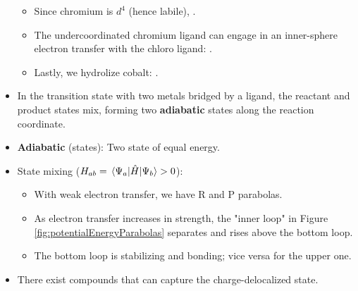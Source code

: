 \documentclass[../notes.tex]{subfiles}
\begin{document}
\begin{itemize}
    \begin{itemize}
        \item Since chromium is $d^4$ (hence labile), .
        \item The undercoordinated chromium ligand can engage in an inner-sphere electron transfer with the chloro ligand: .
        \item Lastly, we hydrolize cobalt: .
    \end{itemize}
    \item In the transition state with two metals bridged by a ligand, the reactant and product states mix, forming two \textbf{adiabatic} states along the reaction coordinate.
    \item \textbf{Adiabatic} (states): Two state of equal energy.
    \item State mixing ($H_{ab}=\mel{\Psi_a}{\hat{H}}{\Psi_b}>0$):
    \begin{itemize}
        \item With weak electron transfer, we have R and P parabolas.
        \item As electron transfer increases in strength, the "inner loop" in Figure \ref{fig:potentialEnergyParabolas} separates and rises above the bottom loop.
        \item The bottom loop is stabilizing and bonding; vice versa for the upper one.
    \end{itemize}
    \item There exist compounds that can capture the charge-delocalized state.
\end{itemize}
\end{document}
